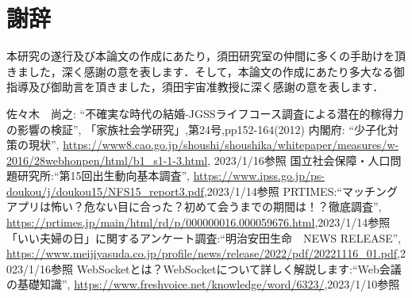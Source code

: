 \documentclass[12pt,a4j,titlepage]{ltjsarticle}
\begin{document}
\clearpage



\section{謝辞}
本研究の遂行及び本論文の作成にあたり，須田研究室の仲間に多くの手助けを頂きました，深く感謝の意を表します．そして，本論文の作成にあたり多大なる御指導及び御助言を頂きました，須田宇宙准教授に深く感謝の意を表します．

\clearpage

\begin{thebibliography}{99}
 佐々木　尚之: ``不確実な時代の結婚-JGSSライフコース調査による潜在的稼得力の影響の検証'', 「家族社会学研究」,第24号,pp152-164(2012)
 内閣府: ``少子化対策の現状'', \url{https://www8.cao.go.jp/shoushi/shoushika/whitepaper/measures/w-2016/28webhonpen/html/b1_s1-1-3.html}, 2023/1/16参照
国立社会保障・人口問題研究所:``第15回出生動向基本調査'',
\url{https://www.ipss.go.jp/ps-doukou/j/doukou15/NFS15_report3.pdf},2023/1/14参照
PRTIMES:``マッチングアプリは怖い？危ない目に合った？初めて会うまでの期間は！？徹底調査'',
\url{https://prtimes.jp/main/html/rd/p/000000016.000059676.html},2023/1/14参照
「いい夫婦の日」に関するアンケート調査:``明治安田生命　NEWS RELEASE'',
\url{https://www.meijiyasuda.co.jp/profile/news/release/2022/pdf/20221116_01.pdf},2023/1/16参照
WebSocketとは？WebSocketについて詳しく解説します:``Web会議の基礎知識'',
\url{https://www.freshvoice.net/knowledge/word/6323/},2023/1/10参照
\end{thebibliography}
\end{document}
